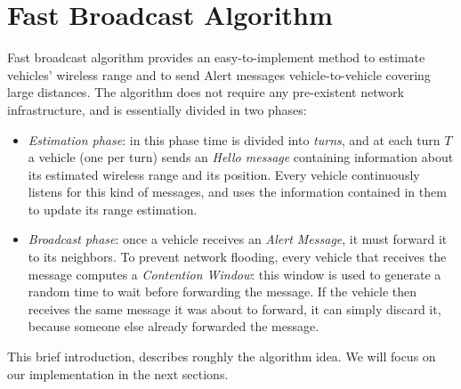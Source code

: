 \section{Fast Broadcast Algorithm}
Fast broadcast algorithm provides an easy-to-implement method to estimate vehicles' wireless range and to send Alert messages vehicle-to-vehicle covering large distances. The algorithm does not require any pre-existent network infrastructure, and is essentially divided in two phases:
	\begin{itemize}
		\item \emph{Estimation phase}: in this phase time is divided into \textit{turns}, and at each turn $T$ a vehicle (one per turn) sends an \emph{Hello message} containing information about its estimated wireless range and its position. Every vehicle continuously listens for this kind of messages, and uses the information contained in them to update its range estimation.
		\item \emph{Broadcast phase}: 
		once a vehicle receives an \textit{Alert Message}, it must forward it to its neighbors. To prevent network flooding, every vehicle that receives the message computes a \textit{Contention Window}: this window is used to generate a random time to wait before forwarding the message. If the vehicle then receives the same message it was about to forward, it can simply discard it, because someone else already forwarded the message.
	\end{itemize} 
	
This brief introduction, describes roughly the algorithm idea. We will focus on our implementation in the next sections.

